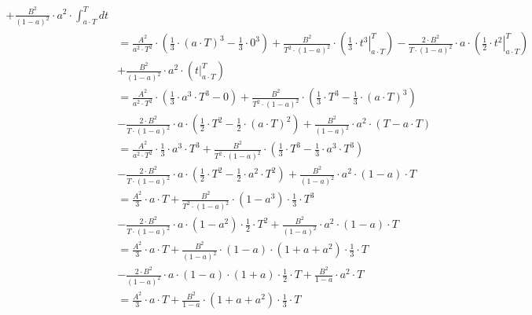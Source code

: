 \begin{task}
\begin{align*}
 + \frac{B^2}{\left(1 - a \right)^2} \cdot a^2 \cdot \int_{a \cdot T}^{T} dt\\
 &=\frac{A^2}{a^2 \cdot T^2}\cdot \left(\frac{1}{3}\cdot \left(a \cdot T\right)^3 - \frac{1}{3}\cdot 0^3 \right)
 +\frac{B^2}{T^2 \cdot \left(1 - a \right)^2}\cdot \left( \left. \frac{1}{3} \cdot t^3 \right|_{a \cdot T}^{T} \right) 
 - \frac{2\cdot B^2}{T\cdot \left(1 - a\right)^2}\cdot a \cdot \left( \left. \frac{1}{2} \cdot t^2 \right|_{a \cdot T}^{T} \right) \\
 &+ \frac{B^2}{\left(1 - a \right)^2} \cdot a^2 \cdot \left( \left. t \right|_{a \cdot T}^{T} \right)\\
 &=\frac{A^2}{a^2 \cdot T^2}\cdot \left(\frac{1}{3}\cdot a^3 \cdot T^3 - 0 \right)
 +\frac{B^2}{T^2 \cdot \left(1 - a \right)^2}\cdot \left( \frac{1}{3} \cdot T^3 -\frac{1}{3} \cdot \left( a\cdot T \right)^3 \right) \\
 &- \frac{2\cdot B^2}{T\cdot \left(1 - a\right)^2}\cdot a \cdot \left( \frac{1}{2} \cdot T^2 -  \frac{1}{2} \cdot \left(a \cdot T\right)^2 \right)
 + \frac{B^2}{\left(1 - a \right)^2} \cdot a^2 \cdot \left( T - a \cdot T \right)\\
 &=\frac{A^2}{a^2 \cdot T^2}\cdot \frac{1}{3}\cdot a^3 \cdot T^3
 +\frac{B^2}{T^2 \cdot \left(1 - a \right)^2}\cdot \left( \frac{1}{3} \cdot T^3 -\frac{1}{3} \cdot a^3 \cdot T ^3 \right) \\
 &- \frac{2\cdot B^2}{T\cdot \left(1 - a\right)^2}\cdot a \cdot \left( \frac{1}{2} \cdot T^2 -  \frac{1}{2} \cdot a^2 \cdot T^2 \right)
 + \frac{B^2}{\left(1 - a \right)^2} \cdot a^2 \cdot \left( 1 - a\right) \cdot T\\
 &=\frac{A^2}{3}\cdot a \cdot T
 +\frac{B^2}{T^2 \cdot \left(1 - a \right)^2}\cdot \left(1 -a^3 \right)\cdot \frac{1}{3} \cdot T^3 \\
 &- \frac{2\cdot B^2}{T\cdot \left(1 - a\right)^2}\cdot a \cdot \left( 1 -   a^2 \right) \cdot \frac{1}{2} \cdot T^2
 + \frac{B^2}{\left(1 - a \right)^2} \cdot a^2 \cdot \left( 1 - a\right) \cdot T\\ 
 &=\frac{A^2}{3}\cdot a \cdot T
 +\frac{B^2}{\left(1 - a\right)^2}\cdot \left(1-a\right)\cdot \left(1 +a + a^2 \right)\cdot \frac{1}{3} \cdot T \\
 &- \frac{2\cdot B^2}{\left(1 - a\right)^2}\cdot a \cdot \left( 1 - a \right) \cdot \left( 1 + a \right) \cdot \frac{1}{2} \cdot T
 + \frac{B^2}{1 - a} \cdot a^2 \cdot T\\
 &=\frac{A^2}{3}\cdot a \cdot T
 +\frac{B^2}{1 - a}\cdot \left(1 +a + a^2 \right)\cdot \frac{1}{3} \cdot T

\end{align*}
\end{task}
